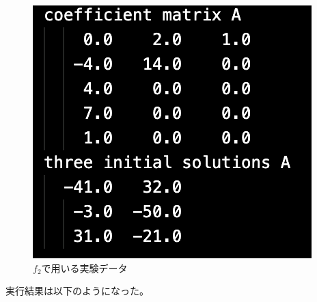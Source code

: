 \documentclass[12pt]{jarticle}
\begin{document}
\begin{figure}[h]
\begin{minipage}{0.3\hsize}
\begin{center}
        \end{center}
    \end{minipage}
    \begin{minipage}{0.3\hsize}
        \begin{center}
            \includegraphics[scale=0.4]{kadai1_2data3.png}
        \end{center}
    \end{minipage}
    \caption{$f_2$で用いる実験データ}
\end{figure}

実行結果は以下のようになった。
\end{document}
